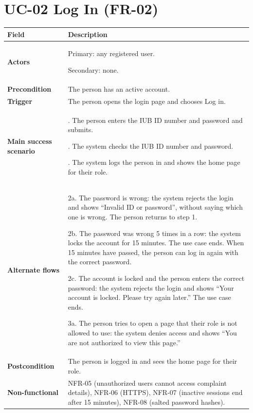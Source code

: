 \documentclass[11pt,a4paper]{report}
\begin{document}
\section{UC-02 Log In (FR-02)}
\begin{longtable}{|>{\raggedright\arraybackslash}p{3.0cm}|>{\raggedright\arraybackslash}p{12.4cm}|}
\hline \textbf{Field} & \textbf{Description} \\ \hline \endhead
\textbf{Actors} & Primary: any registered user.\par\smallskip Secondary: none. \\ \hline
\textbf{Precondition} & The person has an active account. \\ \hline
\textbf{Trigger} & The person opens the login page and chooses Log in. \\ \hline
\textbf{Main success scenario} & 1. The person enters the IUB ID number and password and submits.\par\smallskip 2. The system checks the IUB ID number and password.\par\smallskip 3. The system logs the person in and shows the home page for their role. \\ \hline
\textbf{Alternate flows} & 2a. The password is wrong: the system rejects the login and shows ``Invalid ID or password'', without saying which one is wrong. The person returns to step 1.\par\smallskip 2b. The password was wrong 5 times in a row: the system locks the account for 15 minutes. The use case ends. When 15 minutes have passed, the person can log in again with the correct password.\par\smallskip 2c. The account is locked and the person enters the correct password: the system rejects the login and shows ``Your account is locked. Please try again later.'' The use case ends.\par\smallskip 3a. The person tries to open a page that their role is not allowed to use: the system denies access and shows ``You are not authorized to view this page.'' \\ \hline
\textbf{Postcondition} & The person is logged in and sees the home page for their role. \\ \hline
\textbf{Non-functional} & NFR-05 (unauthorized users cannot access complaint details), NFR-06 (HTTPS), NFR-07 (inactive sessions end after 15 minutes), NFR-08 (salted password hashes). \\ \hline
\end{longtable}
\end{document}
